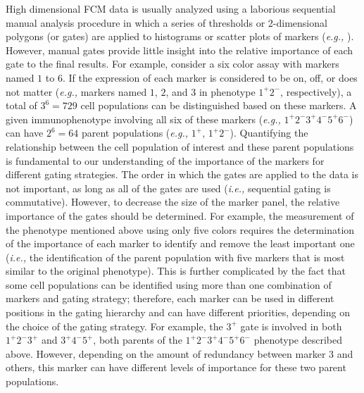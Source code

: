 High dimensional FCM data is usually analyzed using a  laborious sequential manual analysis procedure in which a series of thresholds or 2-dimensional polygons (or gates) are applied to histograms or scatter plots of markers (\emph{e.g.,} \cite{perfetto2004seventeen,gattinoni2011human}).
However, manual gates provide little insight into the relative importance of each gate to the final results.
For example, consider a six color assay with markers named $1$ to $6$.
If the expression of each marker is considered to be on, off, or does not matter (\emph{e.g.,} markers named $1$, $2$, and $3$ in phenotype $1^+2^-$, respectively), a total of $3^6=729$ cell populations can be distinguished based on these markers.
A given immunophenotype involving all six of these markers (\emph{e.g.,} $1^+2^-3^+4^-5^+6^-$) can have $2^6=64$ parent populations (\emph{e.g.,} $1^+$, $1^+2^-$).
Quantifying the relationship between the cell population of interest and these parent populations is fundamental to our understanding of the importance of the markers for different gating strategies.
The order in which the gates are applied to the data is not important, as long as all of the gates are used (\emph{i.e.,} sequential gating is commutative).
However, to decrease the size of the marker panel, the relative importance of the gates should be determined.
For example, the measurement of the phenotype mentioned above using only five colors requires the determination of the importance of each marker to identify and remove the least important one (\emph{i.e.,} the identification of the parent population with five markers that is most similar to the original phenotype).
This is further complicated by the fact that some cell populations can be identified using more than one combination  of markers and gating strategy; therefore, each marker can be used in different positions in the gating hierarchy and can have different priorities, depending on the choice of the gating strategy.
For example, the $3^+$ gate is involved in both $1^+2^-3^+$ and $3^+4^-5^+$, both parents of the $1^+2^-3^+4^-5^+6^-$ phenotype described above.
However, depending on the amount of redundancy between marker $3$ and others, this marker can have different levels of importance for these two parent populations.

